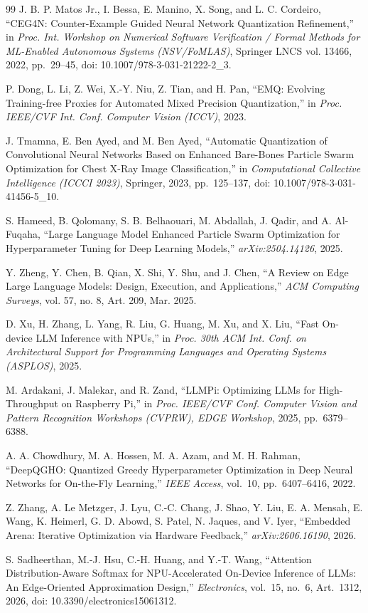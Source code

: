 \documentclass[conference, letterpaper]{IEEEtran}
\begin{document}
\begin{thebibliography}{99}
 J. B. P. Matos Jr., I. Bessa, E. Manino, X. Song, and L. C. Cordeiro, ``CEG4N: Counter-Example Guided Neural Network Quantization Refinement,'' in \emph{Proc. Int. Workshop on Numerical Software Verification / Formal Methods for ML-Enabled Autonomous Systems (NSV/FoMLAS)}, Springer LNCS vol. 13466, 2022, pp.~29--45, doi: 10.1007/978-3-031-21222-2\_3.

 P. Dong, L. Li, Z. Wei, X.-Y. Niu, Z. Tian, and H. Pan, ``EMQ: Evolving Training-free Proxies for Automated Mixed Precision Quantization,'' in \emph{Proc. IEEE/CVF Int. Conf. Computer Vision (ICCV)}, 2023.

 J. Tmamna, E. Ben Ayed, and M. Ben Ayed, ``Automatic Quantization of Convolutional Neural Networks Based on Enhanced Bare-Bones Particle Swarm Optimization for Chest X-Ray Image Classification,'' in \emph{Computational Collective Intelligence (ICCCI 2023)}, Springer, 2023, pp.~125--137, doi: 10.1007/978-3-031-41456-5\_10.

 S. Hameed, B. Qolomany, S. B. Belhaouari, M. Abdallah, J. Qadir, and A. Al-Fuqaha, ``Large Language Model Enhanced Particle Swarm Optimization for Hyperparameter Tuning for Deep Learning Models,'' \emph{arXiv:2504.14126}, 2025.

 Y. Zheng, Y. Chen, B. Qian, X. Shi, Y. Shu, and J. Chen, ``A Review on Edge Large Language Models: Design, Execution, and Applications,'' \emph{ACM Computing Surveys}, vol. 57, no. 8, Art. 209, Mar. 2025.

 D. Xu, H. Zhang, L. Yang, R. Liu, G. Huang, M. Xu, and X. Liu, ``Fast On-device LLM Inference with NPUs,'' in \emph{Proc. 30th ACM Int. Conf. on Architectural Support for Programming Languages and Operating Systems (ASPLOS)}, 2025.

 M. Ardakani, J. Malekar, and R. Zand, ``LLMPi: Optimizing LLMs for High-Throughput on Raspberry Pi,'' in \emph{Proc. IEEE/CVF Conf. Computer Vision and Pattern Recognition Workshops (CVPRW), EDGE Workshop}, 2025, pp.~6379--6388.

 A. A. Chowdhury, M. A. Hossen, M. A. Azam, and M. H. Rahman, ``DeepQGHO: Quantized Greedy Hyperparameter Optimization in Deep Neural Networks for On-the-Fly Learning,'' \emph{IEEE Access}, vol.~10, pp.~6407--6416, 2022.

 Z. Zhang, A. Le Metzger, J. Lyu, C.-C. Chang, J. Shao, Y. Liu, E. A. Mensah, E. Wang, K. Heimerl, G. D. Abowd, S. Patel, N. Jaques, and V. Iyer, ``Embedded Arena: Iterative Optimization via Hardware Feedback,'' \emph{arXiv:2606.16190}, 2026.

 S. Sadheerthan, M.-J. Hsu, C.-H. Huang, and Y.-T. Wang, ``Attention Distribution-Aware Softmax for NPU-Accelerated On-Device Inference of LLMs: An Edge-Oriented Approximation Design,'' \emph{Electronics}, vol.~15, no.~6, Art.~1312, 2026, doi: 10.3390/electronics15061312.

\end{thebibliography}
\end{document}
